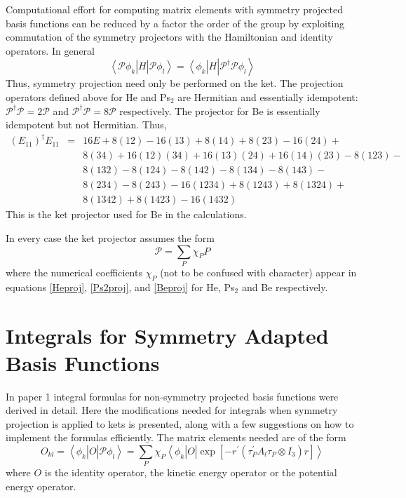 \documentclass[12pt,thmsa]{article}
\begin{document}
Computational effort for computing matrix elements with symmetry projected
basis functions can be reduced by a factor the order of the group by
exploiting commutation of the symmetry projectors with the Hamiltonian and
identity operators. In general 
\begin{equation}
\left\langle \mathcal{P}\phi _k\right| H\left| \mathcal{P}\phi
_l\right\rangle =\left\langle \phi _k\right| H\left| \mathcal{P}^{\dagger }%
\mathcal{P}\phi _l\right\rangle
\end{equation}
Thus, symmetry projection need only be performed on the ket. The projection
operators defined above for He and Ps$_2$ are Hermitian and essentially
idempotent: $\mathcal{P}^{\dagger }\mathcal{P}=2\mathcal{P}$ and $\mathcal{P}%
^{\dagger }\mathcal{P}=8\mathcal{P}$ respectively. The projector for Be is
essentially idempotent but not Hermitian. Thus, 
\begin{eqnarray}
\left( E_{11}\right) ^{\dagger }E_{11} &=&16E+8\left( 12\right) -16\left(
13\right) +8\left( 14\right) +8\left( 23\right) -16\left( 24\right) + 
\nonumber  \label{Beproj} \\
&&8\left( 34\right) +16\left( 12\right) \left( 34\right) +16\left( 13\right)
\left( 24\right) +16\left( 14\right) \left( 23\right) -8\left( 123\right) - 
\nonumber \\
&&8\left( 132\right) -8\left( 124\right) -8\left( 142\right) -8\left(
134\right) -8\left( 143\right) -  \label{Beproj} \\
&&8\left( 234\right) -8\left( 243\right) -16\left( 1234\right) +8\left(
1243\right) +8\left( 1324\right) +  \nonumber \\
&&8\left( 1342\right) +8\left( 1423\right) -16\left( 1432\right)  \nonumber
\end{eqnarray}
This is the ket projector used for Be in the calculations.

In every case the ket projector assumes the form 
\begin{equation}
\mathcal{P=}\sum_P\chi _PP
\end{equation}
where the numerical coefficients $\chi _P$ (not to be confused with
character) appear in equations \ref{Heproj}, \ref{Ps2proj}, and \ref{Beproj}
for He, Ps$_2$ and Be respectively.

\section{Integrals for Symmetry Adapted Basis Functions}

In paper 1 integral formulas for non-symmetry projected basis functions were
derived in detail. Here the modifications needed for integrals when symmetry
projection is applied to kets is presented, along with a few suggestions on
how to implement the formulas efficiently. The matrix elements needed are of
the form 
\[
O_{kl}=\left\langle \phi _k\right| O\left| \mathcal{P}\phi _l\right\rangle
=\sum_P\chi _P\left\langle \phi _k\right| O\left| \exp \left[ -r^{\prime
}\left( \tau _P^{\prime }A_l\tau _P\otimes I_3\right) r\right] \right\rangle 
\]
where $O$ is the identity operator, the kinetic energy operator or the
potential energy operator.
\end{document}
